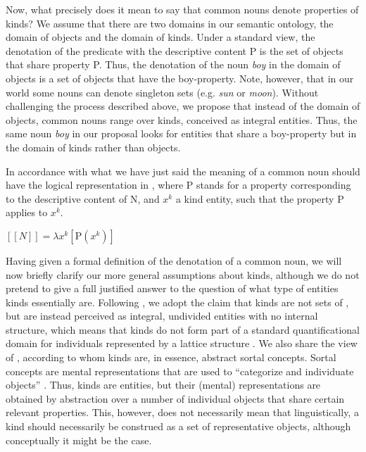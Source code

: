 \documentclass[output=paper
,modfonts
,nonflat]{langsci/langscibook}
\begin{document}
	Now, what precisely does it mean to say that common nouns denote properties of kinds? We assume that there are two domains in our semantic ontology, the domain of objects and the domain of kinds. Under a standard view, the denotation of the predicate with the descriptive content P is the set of objects that share property P. Thus, the denotation of the noun \textit{boy} in the domain of objects is a set of objects that have the boy-property. Note, however, that in our world some nouns can denote singleton sets (e.g. \textit{sun} or \textit{moon}). Without challenging the process described above, we propose that instead of the domain of objects, common nouns range over kinds, conceived as integral entities. Thus, the same noun \textit{boy} in our proposal looks for entities that share a boy-property but in the domain of kinds rather than objects. 
	
	In accordance with what we have just said the meaning of a common noun should have the logical representation in , where P stands for a property corresponding to the descriptive content of N, and $x^k$ a kind entity, such that the property P applies to $x^k$.
	
	\ea\label{ex:borik:5}
	$[\![N]\!] = \lambda{x}^k [\mbox{P}(x^k)]$		
	\z					 
	
	Having given a formal definition of the denotation of a common noun, we will now briefly clarify our more general assumptions about kinds, although we do not pretend to give a full justified answer to the question of what type of entities kinds essentially are. Following \citet{Borik2015}, we adopt the claim that kinds are not sets of , but are instead perceived as integral, undivided entities with no internal structure, which means that kinds do not form part of a standard quantificational domain for individuals represented by a lattice structure \citep{Link1983}. We also share the view of \citet{Mueller-Reichau2011}, according to whom kinds are, in essence, abstract sortal concepts. Sortal concepts are mental representations that are used to ``categorize and individuate objects'' \citep[21]{Mueller-Reichau2011}. Thus, kinds are entities, but their (mental) representations are obtained by abstraction over a number of individual objects that share certain relevant properties. This, however, does not necessarily mean that linguistically, a kind should necessarily be construed as a set of representative objects, although conceptually it might be the case. 
	
\end{document}
